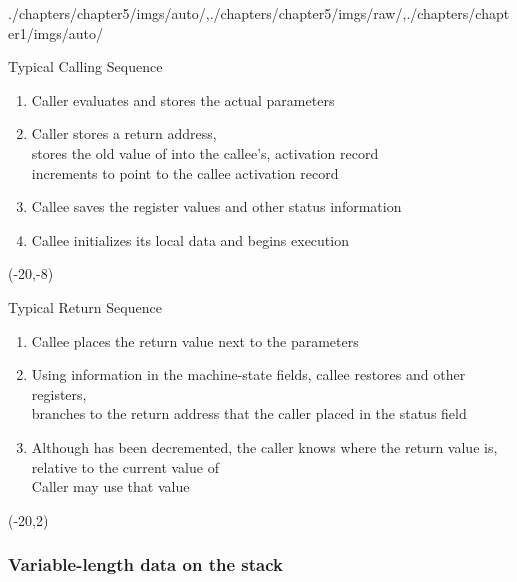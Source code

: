 \begin{graphicspathcontext}{{./chapters/chapter5/imgs/auto/},{./chapters/chapter5/imgs/raw/},{./chapters/chapter1/imgs/auto/}}
\begin{bibunit}[apalike]
\begin{frame}[background=6]{Typical Calling Sequence}
	\begin{enumerate}
		\item Caller evaluates and stores the actual parameters
		\item Caller stores a return address, \\
		stores the old value of  into the callee's, activation record \\
		increments  to point to the callee activation record
		\item Callee saves the register values and other status information
		\item Callee initializes its local data and begins execution
	\end{enumerate}
	\putat(-20,-8){}
\end{frame}

\begin{frame}[background=6]{Typical Return Sequence}
	\begin{enumerate}
		\item Callee places the return value next to the parameters
		\item Using information in the machine-state fields, callee restores  and other registers, \\
		branches to the return address that the caller placed in the status field
		\item Although  has been decremented, the caller knows where the return value is, relative to the current value of  \\
		Caller may use that value
	\end{enumerate}
	\putat(-20,2){}
\end{frame}

\subsubsection{Variable-length data on the stack}
\subsubsectiontableofcontentslide


\end{bibunit}
\end{graphicspathcontext}
